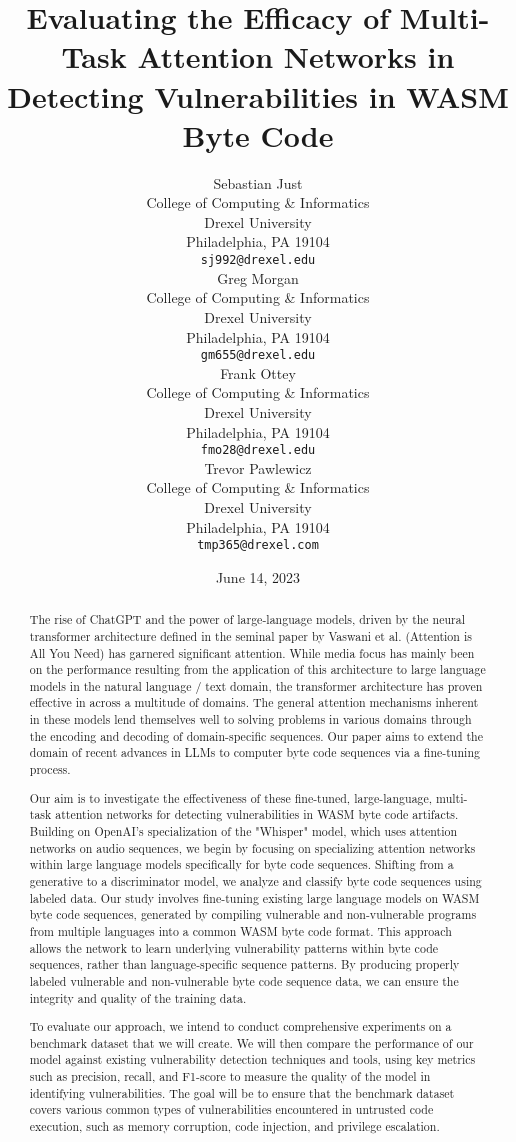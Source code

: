 \documentclass{article}
\title{Evaluating the Efficacy of Multi-Task Attention Networks in Detecting Vulnerabilities in WASM Byte Code}
\date{June 14, 2023}
\author{Sebastian Just \\
	College of Computing \& Informatics\\
	Drexel University\\
	Philadelphia, PA 19104 \\
	\texttt{sj992@drexel.edu} \\
	\And
	Greg Morgan \\
	College of Computing \& Informatics\\
	Drexel University\\
	Philadelphia, PA 19104 \\
	\texttt{gm655@drexel.edu} \\
	\AND
	Frank Ottey \\
	College of Computing \& Informatics\\
	Drexel University\\
	Philadelphia, PA 19104 \\
	\texttt{fmo28@drexel.edu} \\
	\And
	Trevor Pawlewicz\\
	College of Computing \& Informatics\\
	Drexel University\\
	Philadelphia, PA 19104 \\
	\texttt{tmp365@drexel.com} \\
}
\begin{document}
\maketitle

\begin{abstract}
The rise of ChatGPT and the power of large-language models, driven by the neural transformer architecture defined in the seminal paper by Vaswani et al. (Attention is All You Need) has garnered significant attention. While media focus has mainly been on the performance resulting from the application of this architecture to large language models in the natural language / text domain, the transformer architecture has proven effective in across a multitude of domains. The general attention mechanisms inherent in these models lend themselves well to solving problems in various domains through the encoding and decoding of domain-specific sequences. Our paper aims to extend the domain of recent advances in LLMs to computer byte code sequences via a fine-tuning process.

Our aim is to investigate the effectiveness of these fine-tuned, large-language, multi-task attention networks for detecting vulnerabilities in WASM byte code artifacts. Building on OpenAI's specialization of the "Whisper" model, which uses attention networks on audio sequences, we begin by focusing on specializing attention networks within large language models specifically for byte code sequences. Shifting from a generative to a discriminator model, we analyze and classify byte code sequences using labeled data. Our study involves fine-tuning existing large language models on WASM byte code sequences, generated by compiling vulnerable and non-vulnerable programs from multiple languages into a common WASM byte code format. This approach allows the network to learn underlying vulnerability patterns within byte code sequences, rather than language-specific sequence patterns. By producing properly labeled vulnerable and non-vulnerable byte code sequence data, we can ensure the integrity and quality of the training data.

To evaluate our approach, we intend to conduct comprehensive experiments on a benchmark dataset that we will create. We will then compare the performance of our model against existing vulnerability detection techniques and tools, using key metrics such as precision, recall, and F1-score to measure the quality of the model in identifying vulnerabilities. The goal will be to ensure that the benchmark dataset covers various common types of vulnerabilities encountered in untrusted code execution, such as memory corruption, code injection, and privilege escalation.


\end{abstract}
\end{document}
